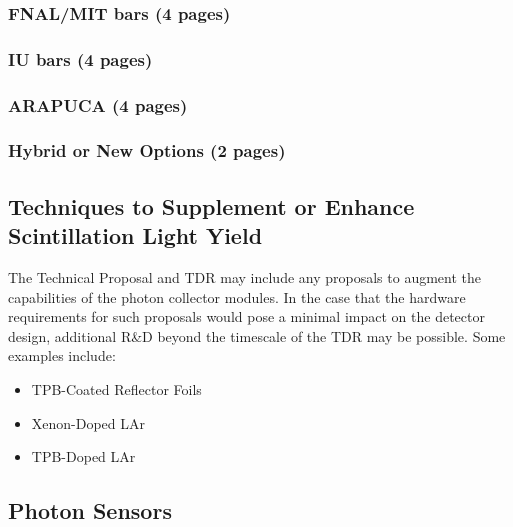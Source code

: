 \subsubsection{FNAL/MIT bars (4 pages)}
\label{ssec:fdsp-pd-pc-bar1}


\subsubsection{IU bars (4 pages)}
\label{ssec:fdsp-pd-pc-bar2}


\subsubsection{ARAPUCA (4 pages)}
\label{ssec:fdsp-pd-pc-arapuca}

\subsubsection{Hybrid or New Options (2 pages)}
\label{ssec:fdsp-pd-pc-new}

\subsection{Techniques to Supplement or Enhance Scintillation Light Yield}
\label{sec:fdsp-pd-enh}

The Technical Proposal and TDR may include any proposals to augment the capabilities of the photon
collector modules. In the case that the hardware requirements for such proposals would pose a minimal
impact on the detector design, additional R\&D beyond the timescale of the TDR may be possible.
Some examples include:
\begin{itemize}
\item TPB-Coated Reflector Foils
\item Xenon-Doped LAr
\item TPB-Doped LAr
\end{itemize}

\subsection{Photon Sensors}
\label{sec:fdsp-pd-ps}



